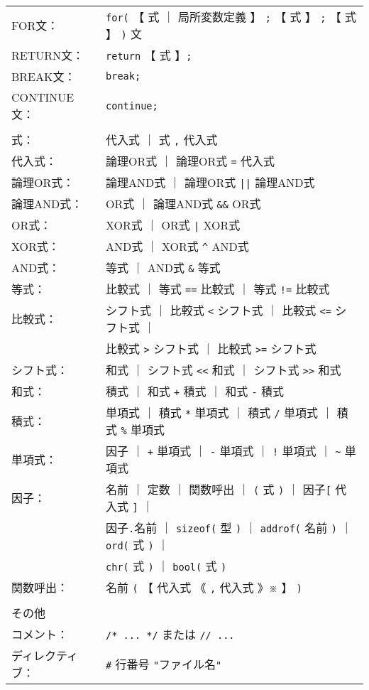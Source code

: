 {\begin{tabular}{l l}
FOR文：       & \verb+for(+ 【 式 ｜ 局所変数定義 】 \verb+;+
               【 式 】 \verb+;+ 【 式 】 \verb+)+ 文 \\
RETURN文：    & \verb+return+ 【 式 】\verb+;+ \\
BREAK文：     & \verb+break;+ \\
CONTINUE文：  & \verb+continue;+ \\
&\\
式：          & 代入式 ｜ 式 \verb+,+ 代入式 \\
代入式：      & 論理OR式 ｜ 論理OR式 \verb+=+ 代入式 \\
論理OR式：    & 論理AND式 ｜ 論理OR式  \verb+||+ 論理AND式 \\
論理AND式：   & OR式 ｜ 論理AND式 \verb+&&+ OR式 \\
OR式：        & XOR式 ｜ OR式 \verb+|+ XOR式 \\
XOR式：       & AND式 ｜ XOR式 \verb+^+ AND式 \\
AND式：       & 等式 ｜ AND式 \verb+&+ 等式 \\
等式：        & 比較式 ｜ 等式 \verb+==+ 比較式 ｜ 等式 \verb+!=+ 比較式 \\
比較式：      & シフト式 ｜ 比較式 \verb+<+ シフト式  ｜
                比較式 \verb+<=+ シフト式 ｜ \\
              & 比較式 \verb+>+ シフト式 ｜ 比較式 \verb+>=+ シフト式 \\
シフト式：    & 和式 ｜ シフト式 \verb+<<+ 和式 ｜ シフト式 \verb+>>+ 和式 \\
和式：        & 積式 ｜ 和式 \verb/+/ 積式 ｜ 和式 \verb+-+ 積式 \\
積式：        & 単項式 ｜ 積式 \verb+*+ 単項式 ｜
                積式 \verb+/+ 単項式 ｜ 積式 \verb+%+ 単項式 \\
単項式：      & 因子 ｜ \verb/+/ 単項式 ｜ \verb+-+ 単項式 ｜
                \verb+!+ 単項式 ｜ \verb+~+ 単項式 \\
因子：        & 名前 ｜ 定数 ｜ 関数呼出 ｜ \verb+(+ 式 \verb+)+ ｜
                因子\verb+[+ 代入式 \verb+]+ ｜ \\
              & 因子\verb+.+名前 ｜ \verb+sizeof(+ 型 \verb+)+ ｜
                \verb+addrof(+ 名前 \verb+)+ ｜ \verb+ord(+ 式 \verb+)+ ｜ \\
              &  \verb+chr(+ 式 \verb+)+ ｜ \verb+bool(+ 式 \verb+)+ \\
関数呼出：    & 名前 \verb+(+ 【 代入式 《 \verb+,+ 代入式 》※ 】 \verb+)+\\
&\\
その他 & \\
コメント：    & \verb+/* ... */+ または \verb+// ...+ \\
ディレクティブ： & \verb+#+ 行番号 \verb+"+ファイル名\verb+"+\\
\end{tabular}
}

